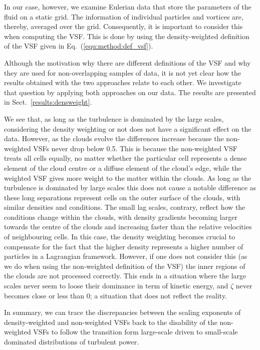 In our case, however, we examine Eulerian data that store the parameters of the fluid on a static grid. 
The information of individual particles and vortices are, thereby, averaged over the grid.
Consequently, it is important to consider this when computing the VSF.
This is done by using the density-weighted definition of the VSF given in Eq.~(\ref{equ:method:def_vsf}).

Although the motivation why there are different definitions of the VSF and why they are used for non-overlapping samples of data, it is not yet clear how the results obtained with the two approaches relate to each other. 
We investigate that question by applying both approaches on our data.
The results are presented in Sect.~\ref{results:densweight}.

We see that, as long as the turbulence is dominated by the large scales, considering the density weighting or not does not have a significant effect on the data. 
However, as the clouds evolve the differences increase because the non-weighted VSFs never drop below 0.5.
This is because the non-weighted VSF treats all cells equally, no matter whether the particular cell represents a dense element of the cloud centre or a diffuse element of the cloud's edge, while the weighted VSF gives more weight to the matter within the clouds.
As long as the turbulence is dominated by large scales this does not cause a notable difference as these long separations represent cells on the outer surface of the clouds, with similar densities and conditions.
The small lag scales, contrary, reflect how the conditions change within the clouds, with density gradients becoming larger towards the centre of the clouds and increasing faster than the relative velocities of neighbouring cells.
In this case, the density weighting becomes crucial to compensate for the fact that the higher density represents a higher number of particles in a Lagrangian framework.
However, if one does not consider this (as we do when using the non-weighted definition of the VSF) the inner regions of the clouds are not processed correctly.
This ends in a situation where the large scales never seem to loose their dominance in term of kinetic energy, and $\zeta$ never becomes close or less than 0; a situation that does not reflect the reality.

In summary, we can trace the discrepancies between the scaling exponents of density-weighted and non-weighted VSFs back to the disability of the non-weighted VSFs to follow the transition form large-scale driven to small-scale dominated distributions of turbulent power.


